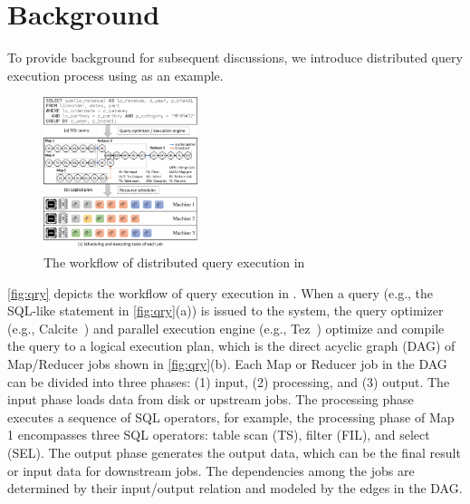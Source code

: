 \section{Background}\label{sec:qryprocessing}
To provide background for subsequent discussions, we introduce distributed query execution process using \hive{} as an example.

\begin{figure}[t]
	\centering
	\includegraphics[width=0.40\textwidth]{figures/system/qry_processingvis.pdf}
	\vspace{-3mm}
	\caption{The workflow of distributed query execution in \hive{}}
	\label{fig:qry}
	\vspace{-6mm}
\end{figure}


\autoref{fig:qry} depicts the workflow of query execution in \hive{}.
When a query (e.g., the SQL-like statement in \autoref{fig:qry}(a)) is issued to the system, the query optimizer (e.g., Calcite~\cite{begoli2018apache}) and parallel execution engine (e.g., Tez~\cite{saha2015apache}) optimize and compile the query to a logical execution plan, which is the direct acyclic graph (DAG) of Map/Reducer jobs shown in \autoref{fig:qry}(b).
Each Map or Reducer job in the DAG can be divided into three phases: (1) input, (2) processing, and (3) output.
The input phase loads data from disk or upstream jobs.
The processing phase executes a sequence of SQL operators, for example, the processing phase of Map 1 encompasses three SQL operators: table scan (TS), filter (FIL), and select (SEL).
The output phase generates the output data, which can be the final result or input data for downstream jobs.
The dependencies among the jobs are determined by their input/output relation and modeled by the edges in the DAG.


